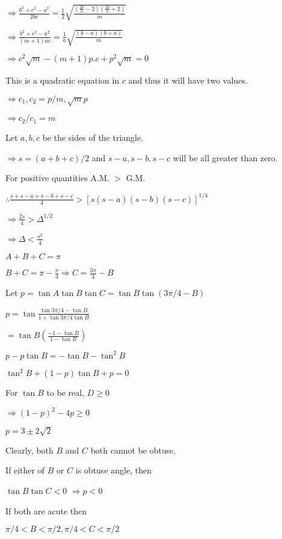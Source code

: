   $\Rightarrow \frac{b^2 + c^2 - a^2}{2bc} = \frac{1}{2}\sqrt{\frac{\left(\frac{2b}{a} - 2\right)\left(\frac{2b}{a} + 2\right)}{m}}$

  $\Rightarrow \frac{b^2 + c^2 - a^2}{(m + 1)ac} = \frac{1}{a}\sqrt{\frac{(b - a)(b + a)}{m}}$

  $\Rightarrow c^2\sqrt{m} - (m + 1)p.c + p^2\sqrt{m} = 0$

  This is a quadratic equation in $c$ and thus it will have two values.

  $\Rightarrow c_1, c_2 = p/m, \sqrt{m}p$

  $\Rightarrow c_2/c_1 = m$

\item Let $a, b, c$ be the sides of the triangle.

  $\Rightarrow s = (a + b + c)/2$ and $s - a, s- b, s - c$ will be all greater than zero.

  For positive quantities A.M. $>$ G.M.

  $\therefore \frac{s + s - a + s - b + s - c}{4} > [s(s - a)(s - b)(s - c)]^{1/4}$

  $\Rightarrow \frac{2s}{4}>\Delta^{1/2}$

  $\Rightarrow \Delta < \frac{s^2}{4}$

\item $A + B + C = \pi$

  $B + C = \pi - \frac{\pi}{4} \Rightarrow C = \frac{3\pi}{4} - B$

  Let $p = \tan A\tan B\tan C = \tan B\tan\left(3\pi/4 - B\right)$

  $p = \tan\frac{\tan3\pi/4 - \tan B}{1 + \tan3\pi/4\tan B}$

  $= \tan B\left(\frac{-1 - \tan B}{1 - \tan B}\right)$

  $p - p\tan B = -\tan B - \tan^2B$

  $\tan^2B + (1 - p)\tan B + p = 0$

  For $\tan B$ to be real, $D\geq 0$

  $\Rightarrow (1 - p)^2 - 4p \geq 0$

  $p = 3\pm 2\sqrt{2}$

  Clearly, both $B$ and $C$ both cannot be obtuse.

  If either of $B$ or $C$ is obtuse angle, then

  $\tan B\tan C < 0$ $\Rightarrow p < 0$

  If both are acute then

  $\pi/4 < B < \pi/2, \pi/4 < C < \pi/2$

